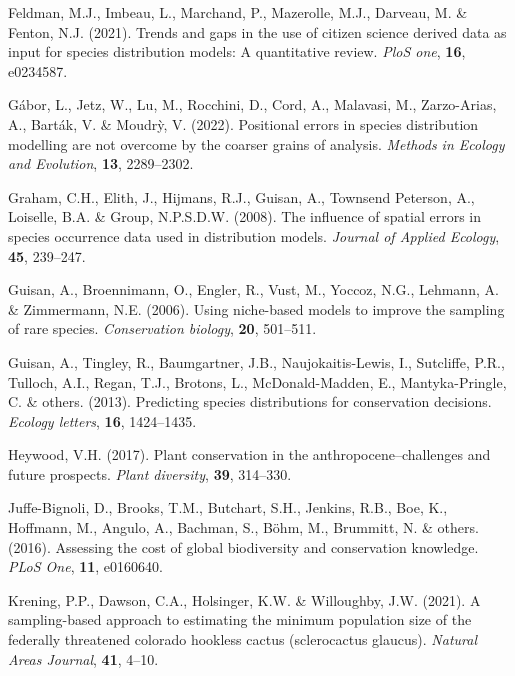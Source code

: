 \documentclass[
]{article}
\newlength{\cslhangindent}
\newlength{\cslentryspacingunit} %
\newenvironment{CSLReferences}[2] %
 {%
  \setlength{\parindent}{0pt}
  \ifodd #1
  \let\oldpar\par
  \def\par{\hangindent=\cslhangindent\oldpar}
  \fi
  \setlength{\parskip}{#2\cslentryspacingunit}
 }%
 {}
\begin{document}
\begin{CSLReferences}{1}{0}
\leavevmode{}%
Feldman, M.J., Imbeau, L., Marchand, P., Mazerolle, M.J., Darveau, M. \&
Fenton, N.J. (2021). Trends and gaps in the use of citizen science
derived data as input for species distribution models: A quantitative
review. \emph{PloS one}, \textbf{16}, e0234587.

\leavevmode{}%
Gábor, L., Jetz, W., Lu, M., Rocchini, D., Cord, A., Malavasi, M.,
Zarzo-Arias, A., Barták, V. \& Moudrỳ, V. (2022). Positional errors in
species distribution modelling are not overcome by the coarser grains of
analysis. \emph{Methods in Ecology and Evolution}, \textbf{13},
2289--2302.

\leavevmode{}%
Graham, C.H., Elith, J., Hijmans, R.J., Guisan, A., Townsend Peterson,
A., Loiselle, B.A. \& Group, N.P.S.D.W. (2008). The influence of spatial
errors in species occurrence data used in distribution models.
\emph{Journal of Applied Ecology}, \textbf{45}, 239--247.

\leavevmode{}%
Guisan, A., Broennimann, O., Engler, R., Vust, M., Yoccoz, N.G.,
Lehmann, A. \& Zimmermann, N.E. (2006). Using niche-based models to
improve the sampling of rare species. \emph{Conservation biology},
\textbf{20}, 501--511.

\leavevmode{}%
Guisan, A., Tingley, R., Baumgartner, J.B., Naujokaitis-Lewis, I.,
Sutcliffe, P.R., Tulloch, A.I., Regan, T.J., Brotons, L.,
McDonald-Madden, E., Mantyka-Pringle, C. \& others. (2013). Predicting
species distributions for conservation decisions. \emph{Ecology
letters}, \textbf{16}, 1424--1435.

\leavevmode{}%
Heywood, V.H. (2017). Plant conservation in the anthropocene--challenges
and future prospects. \emph{Plant diversity}, \textbf{39}, 314--330.

\leavevmode{}%
Juffe-Bignoli, D., Brooks, T.M., Butchart, S.H., Jenkins, R.B., Boe, K.,
Hoffmann, M., Angulo, A., Bachman, S., Böhm, M., Brummitt, N. \& others.
(2016). Assessing the cost of global biodiversity and conservation
knowledge. \emph{PLoS One}, \textbf{11}, e0160640.

\leavevmode{}%
Krening, P.P., Dawson, C.A., Holsinger, K.W. \& Willoughby, J.W. (2021).
A sampling-based approach to estimating the minimum population size of
the federally threatened colorado hookless cactus (sclerocactus
glaucus). \emph{Natural Areas Journal}, \textbf{41}, 4--10.


\end{CSLReferences}
\end{document}
